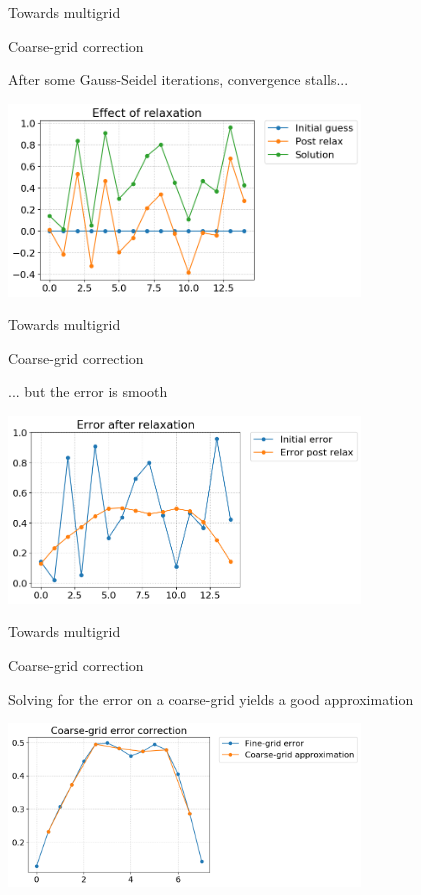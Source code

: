 \documentclass[18pt,xcolor=table]{beamer}
\begin{document}
\begin{frame}{Towards multigrid}
\begin{block}{Coarse-grid correction}
\bit
\item After some Gauss-Seidel iterations, convergence stalls...
\eit
\end{block}
\begin{center}
\includegraphics[width=0.7\textwidth]{../figures/solnPostRelax}
\end{center}
\end{frame}

\begin{frame}{Towards multigrid}
\begin{block}{Coarse-grid correction}
\bit
\item ... but the error is smooth
\eit
\end{block}
\begin{center}
\includegraphics[width=0.7\textwidth]{../figures/errPostRelax}
\end{center}
\end{frame}

\begin{frame}{Towards multigrid}
\begin{block}{Coarse-grid correction}
\bit
\item Solving for the error on a coarse-grid yields a good approximation
\eit
\end{block}
\begin{center}
\includegraphics[width=0.7\textwidth]{../figures/coarseGridErr}
\end{center}
\end{frame}
\end{document}
